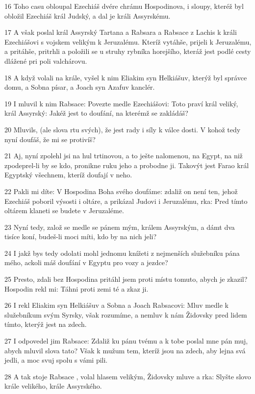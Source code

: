 \par 16 Toho casu obloupal Ezechiáš dvére chrámu Hospodinova, i sloupy, kteréž byl obložil Ezechiáš král Judský, a dal je králi Assyrskému.
\par 17 A však poslal král Assyrský Tartana a Rabsara a Rabsace z Lachis k králi Ezechiášovi s vojskem velikým k Jeruzalému. Kteríž vytáhše, prijeli k Jeruzalému, a pritáhše, pritrhli a položili se u struhy rybníka horejšího, kteráž jest podlé cesty dlážené pri poli valchárovu.
\par 18 A když volali na krále, vyšel k nim Eliakim syn Helkiášuv, kterýž byl správce domu, a Sobna písar, a Joach syn Azafuv kanclér.
\par 19 I mluvil k nim Rabsace: Povezte medle Ezechiášovi: Toto praví král veliký, král Assyrský: Jakéž jest to doufání, na kterémž se zakládáš?
\par 20 Mluvils, (ale slova rtu svých), že jest rady i síly k válce dosti. V kohož tedy nyní doufáš, že mi se protivíš?
\par 21 Aj, nyní zpolehl jsi na hul trtinovou, a to ješte nalomenou, na Egypt, na niž zpodeprel-li by se kdo, pronikne ruku jeho a probodne ji. Takovýt jest Farao král Egyptský všechnem, kteríž doufají v neho.
\par 22 Pakli mi díte: V Hospodina Boha svého doufáme: zdaliž on není ten, jehož Ezechiáš poboril výsosti i oltáre, a prikázal Judovi i Jeruzalému, rka: Pred tímto oltárem klaneti se budete v Jeruzaléme.
\par 23 Nyní tedy, založ se medle se pánem mým, králem Assyrským, a dámt dva tisíce koní, budeš-li moci míti, kdo by na nich jeli?
\par 24 I jakž bys tedy odolati mohl jednomu knížeti z nejmenších služebníku pána mého, ackoli máš doufání v Egyptu pro vozy a jezdce?
\par 25 Presto, zdali bez Hospodina pritáhl jsem proti místu tomuto, abych je zkazil? Hospodin rekl mi: Táhni proti zemi té a zkaz ji.
\par 26 I rekl Eliakim syn Helkiášuv a Sobna a Joach Rabsacovi: Mluv medle k služebníkum svým Syrsky, však rozumíme, a nemluv k nám Židovsky pred lidem tímto, kterýž jest na zdech.
\par 27 I odpovedel jim Rabsace: Zdaliž ku pánu tvému a k tobe poslal mne pán muj, abych mluvil slova tato? Však k mužum tem, kteríž jsou na zdech, aby lejna svá jedli, a moc svuj spolu s vámi pili.
\par 28 A tak stoje Rabsace , volal hlasem velikým, Židovsky mluve a rka: Slyšte slovo krále velikého, krále Assyrského.
